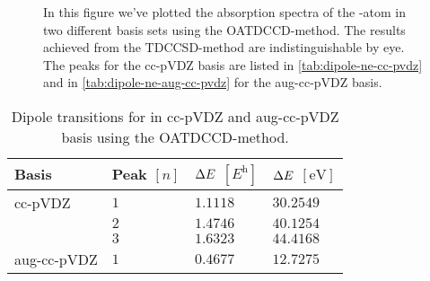        \begin{figure}
            \centering
            \caption{In this figure we've plotted the absorption spectra of the
            -atom in two different basis sets using the OATDCCD-method.
            The results achieved from the TDCCSD-method are indistinguishable by
            eye.
            The peaks for the cc-pVDZ basis are listed in
            \autoref{tab:dipole-ne-cc-pvdz} and in
            \autoref{tab:dipole-ne-aug-cc-pvdz} for the aug-cc-pVDZ basis.}
            \label{fig:ne-spectra}
        \end{figure}

        \begin{table}
            \centering
            \caption{Dipole transitions for  in cc-pVDZ and aug-cc-pVDZ
            basis using the OATDCCD-method.}
            \renewcommand{\arraystretch}{1.3}
            \begin{tabular}{@{}llll@{}}
                \toprule
                Basis & Peak $[n]$
                & $\Delta E$ $[\si{\hartree}]$
                & $\Delta E$ $[\si{\electronvolt}]$
                \\
                \midrule
                cc-pVDZ & $1$ & $1.1118$ & $30.2549$ \\
                & $2$ & $1.4746$ & $40.1254$ \\
                & $3$ & $1.6323$ & $44.4168$ \\
                aug-cc-pVDZ & $1$ & $0.4677$ & $12.7275$ \\
                \bottomrule
            \end{tabular}
            \label{tab:dipole-ar-cc-pvdz}
        \end{table}

